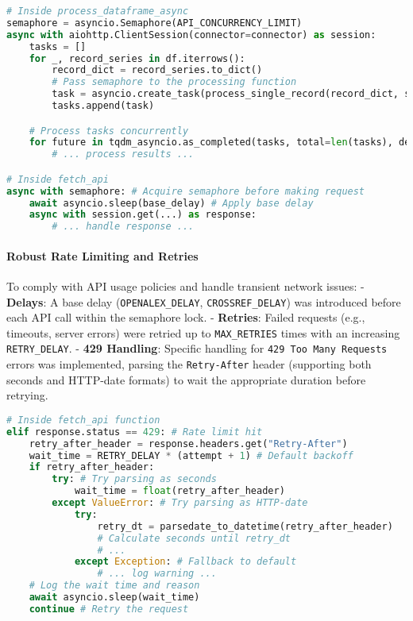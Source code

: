 \documentclass[12pt]{article}
\begin{document}
\begin{lstlisting}[language=Python]
# Inside process_dataframe_async
semaphore = asyncio.Semaphore(API_CONCURRENCY_LIMIT)
async with aiohttp.ClientSession(connector=connector) as session:
    tasks = []
    for _, record_series in df.iterrows():
        record_dict = record_series.to_dict()
        # Pass semaphore to the processing function
        task = asyncio.create_task(process_single_record(record_dict, session, semaphore))
        tasks.append(task)

    # Process tasks concurrently
    for future in tqdm_asyncio.as_completed(tasks, total=len(tasks), desc="Enriching records"):
        # ... process results ...

# Inside fetch_api
async with semaphore: # Acquire semaphore before making request
    await asyncio.sleep(base_delay) # Apply base delay
    async with session.get(...) as response:
        # ... handle response ...
\end{lstlisting}

\paragraph{Robust Rate Limiting and
Retries}\label{robust-rate-limiting-and-retries}

To comply with API usage policies and handle transient network issues: -
\textbf{Delays}: A base delay (\texttt{OPENALEX\_DELAY},
\texttt{CROSSREF\_DELAY}) was introduced before each API call within the
semaphore lock. - \textbf{Retries}: Failed requests (e.g., timeouts,
server errors) were retried up to \texttt{MAX\_RETRIES} times with an
increasing \texttt{RETRY\_DELAY}. - \textbf{429 Handling}: Specific
handling for \texttt{429\ Too\ Many\ Requests} errors was implemented,
parsing the \texttt{Retry-After} header (supporting both seconds and
HTTP-date formats) to wait the appropriate duration before retrying.

\begin{lstlisting}[language=Python]
# Inside fetch_api function
elif response.status == 429: # Rate limit hit
    retry_after_header = response.headers.get("Retry-After")
    wait_time = RETRY_DELAY * (attempt + 1) # Default backoff
    if retry_after_header:
        try: # Try parsing as seconds
            wait_time = float(retry_after_header)
        except ValueError: # Try parsing as HTTP-date
            try:
                retry_dt = parsedate_to_datetime(retry_after_header)
                # Calculate seconds until retry_dt
                # ...
            except Exception: # Fallback to default
                # ... log warning ...
    # Log the wait time and reason
    await asyncio.sleep(wait_time)
    continue # Retry the request
\end{lstlisting}
\end{document}
